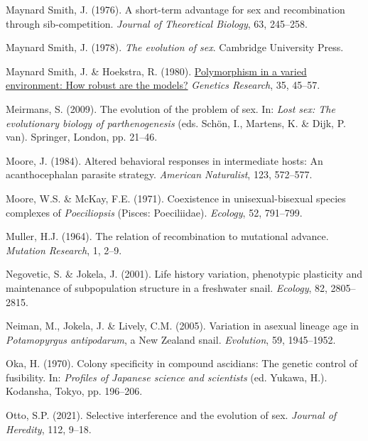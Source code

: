 \documentclass[
  letterpaper,
]{book}
\newlength{\cslhangindent}
\newenvironment{CSLReferences}[2] %
 {\begin{list}{}{%
  \setlength{\itemindent}{0pt}
  \setlength{\leftmargin}{0pt}
  \setlength{\parsep}{0pt}
  \ifodd #1
   \setlength{\leftmargin}{\cslhangindent}
   \setlength{\itemindent}{-1\cslhangindent}
  \fi
  \setlength{\itemsep}{#2\baselineskip}}}
 {\end{list}}
\begin{document}
\begin{CSLReferences}{1}{0}
Maynard Smith, J. (1976). A short-term advantage for sex and
recombination through sib-competition. \emph{Journal of Theoretical
Biology}, 63, 245--258.

Maynard Smith, J. (1978). \emph{The evolution of sex}. Cambridge
University Press.

Maynard Smith, J. \& Hoekstra, R. (1980).
\href{https://doi.org/10.1017/S0016672300013926}{Polymorphism in a
varied environment: How robust are the models?} \emph{Genetics
Research}, 35, 45--57.

Meirmans, S. (2009). The evolution of the problem of sex. In: \emph{Lost
sex: The evolutionary biology of parthenogenesis} (eds. Schön, I.,
Martens, K. \& Dijk, P. van). Springer, London, pp. 21--46.

Moore, J. (1984). Altered behavioral responses in intermediate hosts: An
acanthocephalan parasite strategy. \emph{American Naturalist}, 123,
572--577.

Moore, W.S. \& McKay, F.E. (1971). Coexistence in unisexual-bisexual
species complexes of \emph{{P}oeciliopsis} ({Pisces: Poeciliidae}).
\emph{Ecology}, 52, 791--799.

Muller, H.J. (1964). The relation of recombination to mutational
advance. \emph{Mutation Research}, 1, 2--9.

Negovetic, S. \& Jokela, J. (2001). Life history variation, phenotypic
plasticity and maintenance of subpopulation structure in a freshwater
snail. \emph{Ecology}, 82, 2805--2815.

Neiman, M., Jokela, J. \& Lively, C.M. (2005). Variation in asexual
lineage age in \emph{{P}otamopyrgus antipodarum}, a {New Zealand} snail.
\emph{Evolution}, 59, 1945--1952.

Oka, H. (1970). Colony specificity in compound ascidians: The genetic
control of fusibility. In: \emph{Profiles of {Japanese} science and
scientists} (ed. Yukawa, H.). Kodansha, Tokyo, pp. 196--206.

Otto, S.P. (2021). Selective interference and the evolution of sex.
\emph{Journal of Heredity}, 112, 9--18.


\end{CSLReferences}
\end{document}
